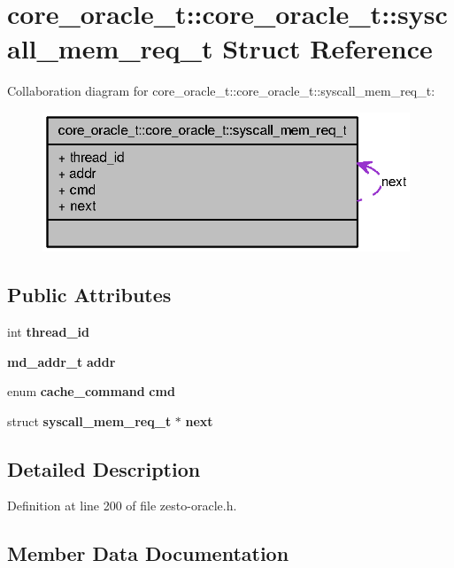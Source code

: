 \section{core\_\-oracle\_\-t::core\_\-oracle\_\-t::syscall\_\-mem\_\-req\_\-t Struct Reference}
\label{structcore__oracle__t_1_1syscall__mem__req__t}
Collaboration diagram for core\_\-oracle\_\-t::core\_\-oracle\_\-t::syscall\_\-mem\_\-req\_\-t:\nopagebreak
\begin{figure}[H]
\begin{center}
\leavevmode
\includegraphics[width=311pt]{structcore__oracle__t_1_1syscall__mem__req__t__coll__graph}
\end{center}
\end{figure}
\subsection*{Public Attributes}
\begin{CompactItemize}
\item 
int {\bf thread\_\-id}
\item 
{\bf md\_\-addr\_\-t} {\bf addr}
\item 
enum {\bf cache\_\-command} {\bf cmd}
\item 
struct {\bf syscall\_\-mem\_\-req\_\-t} $\ast$ {\bf next}
\end{CompactItemize}


\subsection{Detailed Description}


Definition at line 200 of file zesto-oracle.h.

\subsection{Member Data Documentation}
